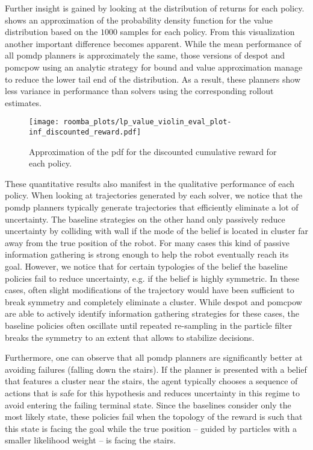 Further insight is gained by looking at the distribution of returns for each
policy.  shows an approximation of the
probability density function for the value distribution based on the $1000$
samples for each policy. From this visualization another important difference
becomes apparent. While the mean performance of all \ac{pomdp} planners is
approximately the same, those versions of \ac{despot} and \ac{pomcpow} using an
analytic strategy for bound and value approximation manage to reduce the lower
tail end of the distribution. As a result, these planners show less variance in
performance than solvers using the corresponding rollout estimates.

\begin{figure}[H]
  \centering
  \texttt{[image: roomba\_plots/lp\_value\_violin\_eval\_plot-inf\_discounted\_reward.pdf]}
  \caption{Approximation of the \acf{pdf} for the discounted cumulative reward
  for each policy.}
  \label{fig:lp-value-violin-inf-discounted}
\end{figure}

These quantitative results also manifest in the qualitative performance of each
policy. When looking at trajectories generated by each solver, we notice that
the \ac{pomdp} planners typically generate trajectories that efficiently
eliminate a lot of uncertainty. The baseline strategies on the other hand only
passively reduce uncertainty by colliding with wall if the mode of the belief
is located in cluster far away from the true position of the robot. For many
cases this kind of passive information gathering is strong enough to help the
robot eventually reach its goal. However, we notice that for certain
typologies of the belief the baseline policies fail to reduce uncertainty, e.g.
if the belief is highly symmetric. In these cases, often slight modifications
of the trajectory would have been sufficient to break symmetry and completely
eliminate a cluster. While \ac{despot} and \ac{pomcpow} are able to actively
identify information gathering strategies for these cases, the baseline
policies often oscillate until repeated re-sampling in the particle filter
breaks the symmetry to an extent that allows to stabilize decisions.

Furthermore, one can observe that all \ac{pomdp} planners are significantly
better at avoiding failures (falling down the stairs). If the planner is
presented with a belief that features a cluster near the stairs, the agent
typically chooses a sequence of actions that is safe for this hypothesis and
reduces uncertainty in this regime to avoid entering the failing terminal
state. Since the baselines consider only the most likely state, these policies
fail when the topology of the reward is such that this state is facing
the goal while the true position -- guided by particles with a smaller
likelihood weight -- is facing the stairs.

